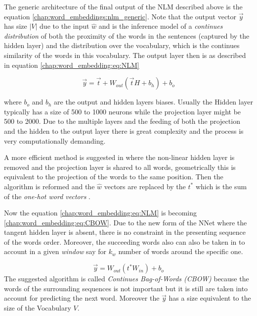 The generic architecture of the final output of the NLM described above is the equation \ref{chap:word_embeddings:nlm_generic}. Note that the output vector $\vec{y}$ has size $|V|$ due to the input $\hat{w}$ and is the inference model of a \textit{continues distribution} of both the proximity of the words in the sentences (captured by the hidden layer) and the distribution over the vocabulary, which is the continues similarity of the words in this vocabulary. The output layer then is as described in equation \ref{chap:word_embedding:eq:NLM}

\begin{equation} \label{chap:word_embedding:eq:NLM}
	\vec{y} = \vec{t} + W_{out}(\vec{t}H + b_{h}) + b_{o}
\end{equation}

\noindent
where $b_{o}$ and $b_{h}$ are the output and hidden layers biases. Usually the Hidden layer typically has a size of 500 to 1000 neurons while the projection layer might be 500 to 2000. Due to the multiple layers and the feeding of both the projection and the hidden to the output layer there is great complexity and the process is very computationally demanding. 

A more efficient method is suggested in \cite{mikolov2013efficient} where the non-linear hidden layer is removed and the projection layer is shared to all words, geometrically this is equivalent to the projection of the words to the same position. Then the algorithm is reformed and the $\hat{w}$ vectors are replaced by the $t^{*}$ which is the sum of the \textit{one-hot word vectors} \cite{mitra2018introduction}. 

Now the equation \ref{chap:word_embedding:eq:NLM} is becoming \ref{chap:word_embedding:eq:CBOW}. Due to the new form of the NNet where the tangent hidden layer is absent, there is no constraint in the presenting sequence of the words order. Moreover, the succeeding words also can also be taken in to account in a given \textit{window} say for $k_{w}$ number of words around the specific one. 

\begin{equation} \label{chap:word_embedding:eq:CBOW}
	\vec{y} = W_{out}(t^{*}W_{in}) + b_{o}
\end{equation}
The suggested algorithm is called \textit{Continues Bag-of-Words (CBOW)} because the words of the surrounding sequences is not important but it is still are taken into account for predicting the next word. Moreover the $\vec{y}$ has a size equivalent to the size of the Vocabulary $V$. 


